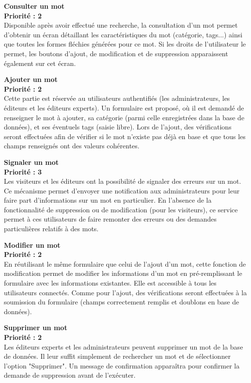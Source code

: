 \documentclass[12pt,a4paper]{article}
\begin{document}
    \textbf{Consulter un mot} \\
    \textbf{Priorité : 2} \\
    Disponible après avoir effectué une recherche, la consultation d'un mot permet d'obtenir un écran détaillant les caractéristiques du mot (catégorie, tags...) ainsi que toutes les formes fléchies générées pour ce mot.
    Si les droits de l'utilisateur le permet, les boutons d'ajout, de modification et de suppression apparaissent également sur cet écran.

    \textbf{Ajouter un mot} \\
    \textbf{Priorité : 2} \\
    Cette partie est réservée au utilisateurs authentifiés (les administrateurs, les éditeurs et les éditeurs experts).
    Un formulaire est proposé, où il est demandé de renseigner le mot à ajouter, sa catégorie (parmi celle enregistrées dans la base de données), et ses éventuels tags (saisie libre).
    Lors de l'ajout, des vérifications seront effectuées afin de vérifier si le mot n'existe pas déjà en base et que tous les champs renseignés ont des valeurs cohérentes.

    \textbf{Signaler un mot} \\
    \textbf{Priorité : 3} \\
    Les visiteurs et les éditeurs ont la possibilité de signaler des erreurs sur un mot.
    Ce mécanisme permet d'envoyer une notification aux administrateurs pour leur faire part d'informations sur un mot en particulier.
    En l'absence de la fonctionnalité de suppression ou de modification (pour les visiteurs), ce service permet à ces utilisateurs de faire remonter des erreurs ou des demandes particulières relatifs à des mots.

    \textbf{Modifier un mot} \\
    \textbf{Priorité : 2} \\
    En réutilisant le même formulaire que celui de l'ajout d'un mot, cette fonction de modification permet de modifier les informations d'un mot en pré-remplissant le formulaire avec les informations existantes. Elle est accessible à tous les utilisateurs connectés. Comme pour l'ajout, des vérifications seront effectuées à la soumission du formulaire (champs correctement remplis et doublons en base de données).

    \textbf{Supprimer un mot} \\
    \textbf{Priorité : 2} \\
    Les éditeurs experts et les administrateurs peuvent supprimer un mot de la base de données. Il leur suffit simplement de rechercher un mot et de sélectionner l'option "Supprimer". Un message de confirmation apparaîtra pour confirmer la demande de suppression avant de l'exécuter.
\end{document}
